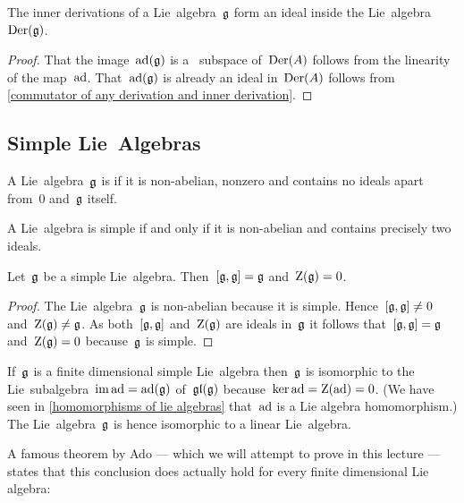 \begin{corollary}
  \label{inner derivations are an ideal}
  The inner derivations of a Lie~algebra~$\mathfrak{g}$ form an ideal inside the Lie~algebra~$\operatorname{Der}(\mathfrak{g})$.
\end{corollary}

\begin{proof}
  That the image~$\operatorname{ad}(\mathfrak{g})$ is a~{\linear{$\kf$}} subspace of~$\operatorname{Der}(A)$ follows from the linearity of the map~$\operatorname{ad}$.
  That~$\operatorname{ad}(\mathfrak{g})$ is already an ideal in~$\operatorname{Der}(A)$ follows from \cref{commutator of any derivation and inner derivation}.
\end{proof}





\subsection{Simple Lie~Algebras}


\begin{definition}
 A Lie~algebra~$\mathfrak{g}$ is  if it is non-abelian, nonzero and contains no ideals apart from~$0$ and~$\mathfrak{g}$ itself.
\end{definition}


\begin{remark}
  A Lie~algebra is simple if and only if it is non-abelian and contains precisely two ideals.
\end{remark}


\begin{lemma}
 Let~$\mathfrak{g}$ be a simple Lie~algebra.
 Then~$[\mathfrak{g}, \mathfrak{g}] = \mathfrak{g}$ and~$\operatorname{Z}(\mathfrak{g}) = 0$.
\end{lemma}


\begin{proof}
 The Lie~algebra~$\mathfrak{g}$ is non-abelian because it is simple.
 Hence~$[\mathfrak{g}, \mathfrak{g}] \neq 0$ and~$\operatorname{Z}(\mathfrak{g}) \neq \mathfrak{g}$.
 As both~$[\mathfrak{g}, \mathfrak{g}]$ and~$\operatorname{Z}(\mathfrak{g})$ are ideals in~$\mathfrak{g}$ it follows that~$[\mathfrak{g}, \mathfrak{g}] = \mathfrak{g}$ and~$\operatorname{Z}(\mathfrak{g}) = 0$ because~$\mathfrak{g}$ is simple.
\end{proof}


\begin{remark}
  If~$\mathfrak{g}$ is a finite dimensional simple Lie~algebra then~$\mathfrak{g}$ is isomorphic to the Lie~subalgebra~$\operatorname{im} \operatorname{ad} = \operatorname{ad}(\mathfrak{g})$ of~$\mathfrak{gl}(\mathfrak{g})$ because~$\ker \operatorname{ad} = \operatorname{Z}(\operatorname{ad}) = 0$.
  (We have seen in \cref{homomorphisms of lie algebras} that~$\operatorname{ad}$ is a Lie algebra homomorphism.)
  The Lie~algebra~$\mathfrak{g}$ is hence isomorphic to a linear Lie~algebra.
  
  A famous theorem by Ado --- which we will attempt to prove in this lecture --- states that this conclusion does actually hold for every finite dimensional Lie algebra:
\end{remark}


